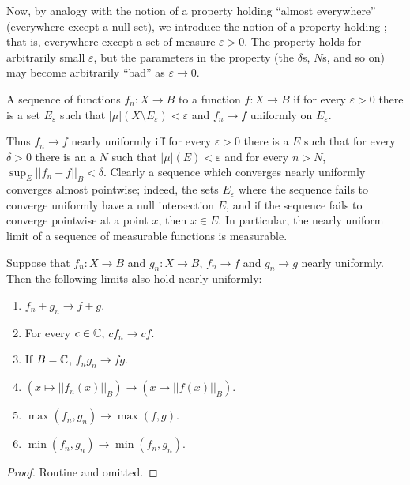 \begin{subsec}
Now, by analogy with the notion of a property holding ``almost everywhere'' (everywhere except a null set), we introduce the notion of a property holding ; that is, everywhere except a set of measure $\varepsilon > 0$. The property holds for arbitrarily small $\varepsilon$, but the parameters in the property (the $\delta$s, $N$s, and so on) may become arbitrarily ``bad'' as $\varepsilon \to 0$.
\end{subsec}

\begin{definition}
A sequence of functions $f_{n}: X \to B$  to a function $f: X \to B$ if for every $\varepsilon > 0$ there is a set $E_\varepsilon$ such that $|\mu|(X \setminus E_\varepsilon) < \varepsilon$ and $f_{n} \to f$ uniformly on $E_\varepsilon$.
\end{definition}

\begin{subsec}
Thus $f_{n} \to f$ nearly uniformly iff for every $\varepsilon > 0$ there is a $E$ such that for every $\delta > 0$ there is an a $N$ such that $|\mu|(E) < \varepsilon$ and for every $n > N$, $\sup_{E} ||f_{n} - f||_{B} < \delta$.
Clearly a sequence which converges nearly uniformly converges almost pointwise; indeed, the sets $E_\varepsilon$ where the sequence fails to converge uniformly have a null intersection $E$, and if the sequence fails to converge pointwise at a point $x$, then $x \in E$.
In particular, the nearly uniform limit of a sequence of measurable functions is measurable.
\end{subsec}

\begin{lemma}
Suppose that $f_{n}: X \to B$ and $g_{n}: X \to B$, $f_{n} \to f$ and $g_{n} \to g$ nearly uniformly. Then the following limits also hold nearly uniformly:
\begin{enumerate}
\item $f_{n} + g_{n} \to f + g$.
\item For every $c \in \mathbb{C}$, $cf_{n} \to cf$.
\item If $B = \mathbb{C}$, $f_{n}g_{n} \to fg$.
\item $(x \mapsto ||f_{n}(x)||_B) \to (x \mapsto ||f(x)||_B)$.
\item $\max(f_{n}, g_{n}) \to \max(f, g)$.
\item $\min(f_{n}, g_{n}) \to \min(f_{n}, g_{n})$.
\end{enumerate}
\end{lemma}
\begin{proof}
Routine and omitted.
\end{proof}

